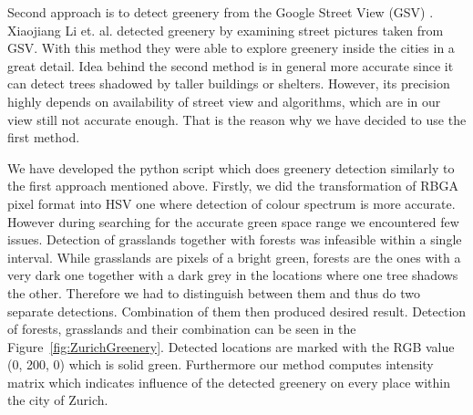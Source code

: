 \documentclass[letterpaper]{article}
\begin{document}
\indent Second approach is to detect greenery from the Google Street View (GSV) \cite{googleView}. Xiaojiang Li et. al. detected greenery by examining street
pictures taken from GSV. With this method they were able to explore greenery inside the cities in a great detail. Idea behind the second method is in general
more accurate since it can detect trees shadowed by taller buildings or shelters. However, its precision highly depends on availability of street view and
algorithms, which are in our view still not accurate enough. That is the reason why we have decided to use the first method.

\indent We have developed the python script which does greenery detection similarly to the first approach mentioned above.
Firstly, we did the transformation of RBGA pixel format into HSV one where detection of colour spectrum is more accurate.
However during searching for the accurate green space range we encountered few issues. Detection of grasslands together
with forests was infeasible within a single interval. While grasslands are pixels of a bright green, forests are
the ones with a very dark one together with a dark grey in the locations where one tree shadows the other.
Therefore we had to distinguish between them and thus do two separate detections. Combination of them then
produced desired result. Detection of forests, grasslands and their combination can be seen in the Figure~\ref{fig:ZurichGreenery}.
Detected locations are marked with the RGB value (0, 200, 0) which is solid green. Furthermore our method computes intensity matrix
which indicates influence of the detected greenery on every place within the city of Zurich.
\end{document}
